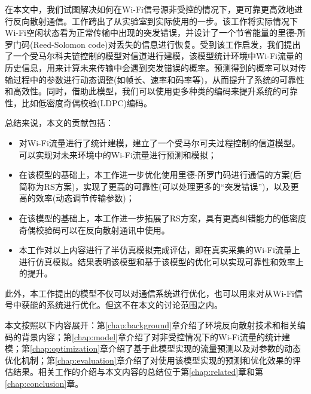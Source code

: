 
在本文中，我们试图解决如何在Wi-Fi信号源非受控的情况下，更可靠更高效地进行反向散射通信。工作\cite{OFFB}跨出了从实验室到实际使用的一步。该工作将实际情况下Wi-Fi空闲状态看为正常传输中出现的突发错误，并设计了一个节省能量的里德-所罗门码(Reed-Solomon code)对丢失的信息进行恢复。受到该工作启发，我们提出了一个受马尔科夫链控制的模型对信道进行建模，该模型统计环境中Wi-Fi流量的历史信息，用来计算未来传输中会遇到突发错误的概率。预测得到的概率可以对传输过程中的参数进行动态调整(如帧长、速率和码率等)，从而提升了系统的可靠性和高效性。同时，借助此模型，我们可以使用更多种类的编码来提升系统的可靠性，比如低密度奇偶校验(LDPC)编码。


总结来说，本文的贡献包括：

\begin{itemize}
	\item 对Wi-Fi流量进行了统计建模，建立了一个受马尔可夫过程控制的信道模型。可以实现对未来环境中的Wi-Fi流量进行预测和模拟；
	
	\item 在该模型的基础上，本工作进一步优化使用里德-所罗门码进行通信的方案(后简称为RS方案)，实现了更高的可靠性(可以处理更多的“突发错误”)，以及更高的效率(动态调节传输参数)；
	
	\item 在该模型的基础上，本工作进一步拓展了RS方案，具有更高纠错能力的低密度奇偶校验码可以在反向散射通讯中使用。
	
	\item 本工作对以上内容进行了半仿真模拟完成评估，即在真实采集的Wi-Fi流量上进行仿真模拟。结果表明该模型和基于该模型的优化可以实现可靠性和效率上的提升。
\end{itemize}

此外，本工作提出的模型不仅可以对通信系统进行优化，也可以用来对从Wi-Fi信号中获能的系统进行优化。但这不在本文的讨论范围之内。

本文按照以下内容展开：第\ref{chap:background}章介绍了环境反向散射技术和相关编码的背景内容；第\ref{chap:model}章介绍了对非受控情况下的Wi-Fi流量的统计建模；第\ref{chap:optimization}章介绍了基于此模型实现的流量预测以及对参数的动态优化机制；第\ref{chap:evaluation}章介绍了对使用该模型实现的预测和优化效果的评估结果。相关工作的介绍与本文内容的总结位于第\ref{chap:related}章和第\ref{chap:conclusion}章。
